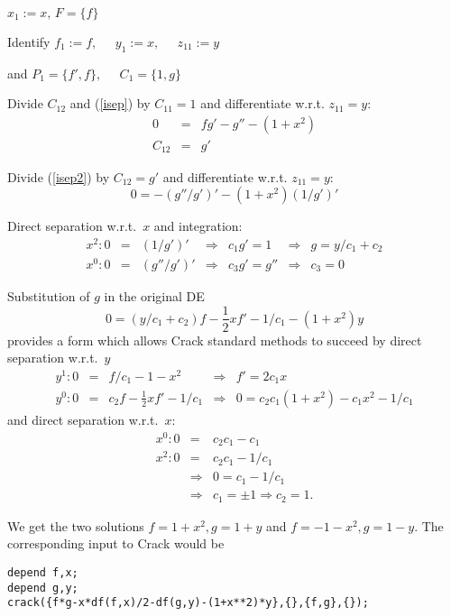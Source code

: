 \documentclass[12pt]{article}
\begin{document}
\begin{description}
 \item $x_1:=x, \, F=\{f\}$
 \begin{description}
  \item Identify $f_1:=f, \; \; \; \; \; y_1:=x, \; \; \; \; \; z_{11}:=y$ 
  \item and $P_1=\{f',f\}, \; \; \; \; \; C_1=\{1,g\}$
  \begin{description}
   \item Divide $C_{12}$ and 
         (\ref{isep}) by $C_{11}=1$ and differentiate w.r.t. $z_{11}=y:$
         \begin{eqnarray}
         0 & = & fg' - g'' - (1+x^2)   \label{isep2}  \\
         C_{12} & = & g'    \nonumber
         \end{eqnarray}
 \item Divide (\ref{isep2}) by $C_{12}=g'$ and differentiate w.r.t. $z_{11}=y:$
\[ 0 = - (g''/g')' - (1+x^2)(1/g')' \]

  \end{description}
 \end{description}
 \item Direct separation w.r.t.\ $x$ and integration:
 \[\begin{array}{rclclcl}
  x^2: 0 & = & (1/g')' & \Rightarrow & c_1g' =  1 & \Rightarrow &
        g = y/c_1 + c_2 \\
  x^0: 0 & = & (g''/g')' & \Rightarrow & c_3g' = g'' & \Rightarrow &
        c_3 = 0
 \end{array} \]
 \item Substitution of $g$ in the original DE
       \[0 = (y/c_1+c_2)f - \frac{1}{2}xf' - 1/c_1 - (1+x^2)y \]
       provides a form which allows {\sc Crack} standard methods to succeed
       by direct separation w.r.t.\ $y$
 \[\begin{array}{rclcl}
  y^1: 0 & = & f/c_1 - 1 - x^2               & \Rightarrow & f'  =  2c_1x \\
  y^0: 0 & = & c_2f - \frac{1}{2}xf' - 1/c_1 & \Rightarrow & 0   =  
       c_2c_1(1+x^2) - c_1x^2 - 1/c_1
 \end{array}\]
       and direct separation w.r.t.\ $x$:
 \begin{eqnarray*}
 x^0:  0 & = & c_2c_1 - c_1    \\
 x^2:  0 & = & c_2c_1 - 1/c_1   \\
    & \Rightarrow &  0 = c_1 - 1/c_1   \\
    & \Rightarrow & c_1 = \pm 1 \Rightarrow c_2 = 1.
 \end{eqnarray*}
\end{description}
We get the two solutions $f = 1 + x^2, g = 1 + y$ and 
$f = - 1 - x^2, g = 1 - y.$ The corresponding input to {\sc Crack} would be
\begin{verbatim}
depend f,x;
depend g,y;
crack({f*g-x*df(f,x)/2-df(g,y)-(1+x**2)*y},{},{f,g},{});
\end{verbatim}
 
\end{document}
